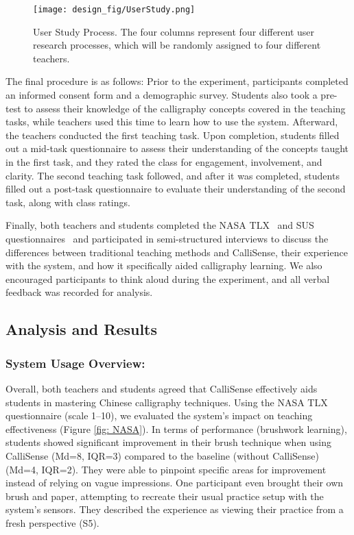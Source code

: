 \begin{figure}[t]
    \centering
    \texttt{[image: design\_fig/UserStudy.png]}
    \caption{User Study Process. The four columns represent four different user research processes, which will be randomly assigned to four different teachers.}
    \label{fig:user study process}
\end{figure}

The final procedure is as follows: Prior to the experiment, participants completed an informed consent form and a demographic survey. Students also took a pre-test to assess their knowledge of the calligraphy concepts covered in the teaching tasks, while teachers used this time to learn how to use the system. Afterward, the teachers conducted the first teaching task. Upon completion, students filled out a mid-task questionnaire to assess their understanding of the concepts taught in the first task, and they rated the class for engagement, involvement, and clarity. The second teaching task followed, and after it was completed, students filled out a post-task questionnaire to evaluate their understanding of the second task, along with class ratings.

Finally, both teachers and students completed the NASA TLX~\cite{hart2006nasa} and SUS questionnaires~\cite{10.5555/2835587.2835589} and participated in semi-structured interviews to discuss the differences between traditional teaching methods and CalliSense, their experience with the system, and how it specifically aided calligraphy learning. We also encouraged participants to think aloud during the experiment, and all verbal feedback was recorded for analysis.

\subsection{Analysis and Results}

\subsubsection{System Usage Overview:}

Overall, both teachers and students agreed that CalliSense effectively aids students in mastering Chinese calligraphy techniques. Using the NASA TLX questionnaire (scale 1–10), we evaluated the system's impact on teaching effectiveness (Figure \ref{fig: NASA}). In terms of performance (brushwork learning), students showed significant improvement in their brush technique when using CalliSense (Md=8, IQR=3) compared to the baseline (without CalliSense) (Md=4, IQR=2). They were able to pinpoint specific areas for improvement instead of relying on vague impressions. One participant even brought their own brush and paper, attempting to recreate their usual practice setup with the system's sensors. They described the experience as viewing their practice from a fresh perspective (S5).

